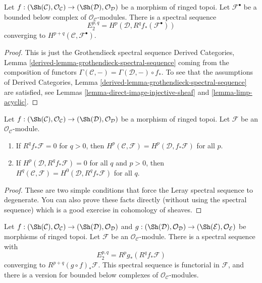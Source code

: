 \begin{lemma}
\label{lemma-Leray}
Let $f : (\Sh(\mathcal{C}), \mathcal{O}_\mathcal{C}) \to
(\Sh(\mathcal{D}), \mathcal{O}_\mathcal{D})$ be a morphism of ringed topoi.
Let $\mathcal{F}^\bullet$ be a bounded below complex of
$\mathcal{O}_\mathcal{C}$-modules. There is a spectral sequence
$$
E_2^{p, q} = H^p(\mathcal{D}, R^qf_*(\mathcal{F}^\bullet))
$$
converging to $H^{p + q}(\mathcal{C}, \mathcal{F}^\bullet)$.
\end{lemma}

\begin{proof}
This is just the Grothendieck spectral sequence
Derived Categories, Lemma \ref{derived-lemma-grothendieck-spectral-sequence}
coming from the composition of functors
$\Gamma(\mathcal{C}, -) = \Gamma(\mathcal{D}, -) \circ f_*$.
To see that the assumptions of
Derived Categories, Lemma \ref{derived-lemma-grothendieck-spectral-sequence}
are satisfied, see
Lemmas \ref{lemma-direct-image-injective-sheaf} and
\ref{lemma-limp-acyclic}.
\end{proof}

\begin{lemma}
\label{lemma-apply-Leray}
Let $f : (\Sh(\mathcal{C}), \mathcal{O}_\mathcal{C}) \to
(\Sh(\mathcal{D}), \mathcal{O}_\mathcal{D})$ be a morphism of ringed topoi.
Let $\mathcal{F}$ be an $\mathcal{O}_\mathcal{C}$-module.
\begin{enumerate}
\item If $R^qf_*\mathcal{F} = 0$ for $q > 0$, then
$H^p(\mathcal{C}, \mathcal{F}) = H^p(\mathcal{D}, f_*\mathcal{F})$ for all $p$.
\item If $H^p(\mathcal{D}, R^qf_*\mathcal{F}) = 0$ for all $q$ and $p > 0$,
then $H^q(\mathcal{C}, \mathcal{F}) = H^0(\mathcal{D}, R^qf_*\mathcal{F})$
for all $q$.
\end{enumerate}
\end{lemma}

\begin{proof}
These are two simple conditions that force the Leray spectral sequence to
degenerate. You can also prove these facts directly (without using the
spectral sequence) which is a good exercise in cohomology of sheaves.
\end{proof}

\begin{lemma}
\label{lemma-relative-Leray}
Let
$f : (\Sh(\mathcal{C}), \mathcal{O}_\mathcal{C}) \to
(\Sh(\mathcal{D}), \mathcal{O}_\mathcal{D})$
and
$g : (\Sh(\mathcal{D}), \mathcal{O}_\mathcal{D}) \to
(\Sh(\mathcal{E}), \mathcal{O}_\mathcal{E})$
be morphisms of ringed topoi.
Let $\mathcal{F}$ be an $\mathcal{O}_\mathcal{C}$-module.
There is a spectral sequence with
$$
E_2^{p, q} = R^pg_*(R^qf_*\mathcal{F})
$$
converging to $R^{p + q}(g \circ f)_*\mathcal{F}$.
This spectral sequence is functorial in $\mathcal{F}$, and there
is a version for bounded below complexes of $\mathcal{O}_\mathcal{C}$-modules.
\end{lemma}

